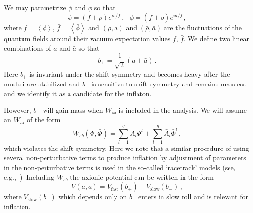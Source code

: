 \documentclass[11pt]{article}
\begin{document}
We may parametrize $\phi$ and $\bar\phi$ so that
\begin{equation}
  \phi = \left(f + \rho\right) e^{i a / f}\,,
  ~~~ \bar\phi = \left(\bar f + \bar\rho\right) e^{i \bar a / \bar f}\,,
\end{equation}
where $f = \left<\phi\right>$, $\bar f = \left<\bar\phi\right>$ and $\left(\rho, a\right)$ and $\left(\bar\rho, \bar a\right)$ are the fluctuations of the quantum fields around their vacuum expectation values $f$, $\bar f$.
We define two linear combinations of $a$ and $\bar a$ so that
\begin{equation} \label{eq:b+-}
  b_{\pm}= \frac{1}{\sqrt 2} \left(a \pm \bar a\right)\,.
\end{equation}
Here $b_+$ is invariant under the shift symmetry and becomes heavy after the moduli are stabilized and $b_-$ is sensitive to shift symmetry and remains massless and we identify it as a candidate for the inflaton.

However, $b_-$ will gain mass when $W_{sb}$ is included in the analysis.
We will assume an $W_{sb}$ of the form
\begin{equation} \label{eq:supersymmetry:Wsb}
  W_{sb}\left(\Phi, \bar\Phi\right) =
      \sum_{l = 1}^q A_l \Phi^l
    + \sum_{l = 1}^q \bar A_l \bar\Phi^l\,,
\end{equation}
which violates the shift symmetry.
Here we note that a similar procedure of using several non-perturbative terms to produce inflation by adjustment of parameters in the non-perturbative terms is used in the so-called `racetrack' models (see, e.g.,~\cite{BlancoPillado:2004ns, Lalak:2005hr, Greene:2005rn, BlancoPillado:2006he}).
Including $W_{sb}$ the axionic potential can be written in the form
\begin{equation}
  V\left(a, \bar a\right) = V_\text{fast}\left(b_+\right) + V_\text{slow}\left(b_-\right)\,,
\end{equation}
where $V_\text{slow}\left(b_-\right)$ which depends only on $b_-$ enters in slow roll and is relevant for inflation.
\end{document}
